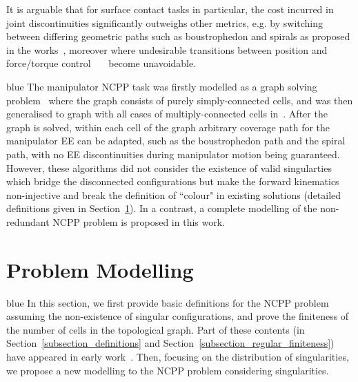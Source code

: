 \documentclass[Afour,sageh,times]{sagej}
\begin{document}
It is arguable that for surface contact tasks in particular, the cost incurred in joint discontinuities significantly 
outweighs other metrics, e.g. by switching between differing geometric paths such as boustrophedon and spirals as proposed in the works~\cite{Hassan2018A}, moreover where undesirable transitions between position and force/torque control~\cite{heck2015switched}~\cite{mirrazavi2018a}~\cite{solanes2018adaptive} become unavoidable.
\begin{color}{blue}
The manipulator NCPP task was firstly modelled as a graph solving problem~\cite{Yang2020Cellular} where the graph consists of purely simply-connected cells, and was then generalised to graph with all cases of multiply-connected cells in~\cite{Yang2020Nonrevisiting}. 
After the graph is solved, within each cell of the graph arbitrary coverage path for the manipulator EE can be adapted, such as the boustrophedon path and the spiral path, with no EE discontinuities during manipulator motion being guaranteed. 
However, these algorithms did not consider the existence of valid singularties which bridge the disconnected configurations but make the forward kinematics non-injective and break the definition of ``colour" in existing solutions (detailed definitions given in Section~\ref{section_problem_modelling}). 
In a contrast, a complete modelling of the non-redundant NCPP problem is proposed in this work. 

\end{color}

\section{Problem Modelling}\label{section_problem_modelling}
\begin{color}{blue}
In this section, we first provide basic definitions for the NCPP problem assuming the non-existence of singular configurations, and prove the finiteness of the number of cells in the topological graph. 
Part of these contents (in Section~\ref{subsection_definitions} and Section~\ref{subsection_regular_finiteness}) have appeared in early work~\cite{Yang2020Nonrevisiting}. 
Then, focusing on the distribution of singularities, we propose a new modelling to the NCPP problem considering singularities. 
\end{color}
\end{document}
